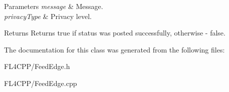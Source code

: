 \begin{DoxyParams}{Parameters}
{\em message} & Message. \\
\hline
{\em privacy\+Type} & Privacy level.\\
\hline
\end{DoxyParams}
\begin{DoxyReturn}{Returns}
Returns true if status was posted successfully, otherwise -\/ false. 
\end{DoxyReturn}


The documentation for this class was generated from the following files\+:\begin{DoxyCompactItemize}
\item 
F\+L4\+C\+P\+P/Feed\+Edge.\+h\item 
F\+L4\+C\+P\+P/Feed\+Edge.\+cpp\end{DoxyCompactItemize}
